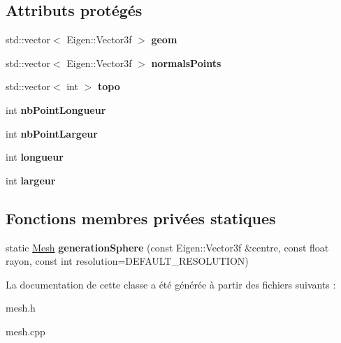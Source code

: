 \subsection*{Attributs protégés}
\begin{DoxyCompactItemize}
\item 
\hypertarget{class_mesh_a1560e73fd9881dc165885de0aadfcdc2}{}std\+::vector$<$ Eigen\+::\+Vector3f $>$ {\bfseries geom}\label{class_mesh_a1560e73fd9881dc165885de0aadfcdc2}

\item 
\hypertarget{class_mesh_ac979277bfe1f58be9e68cb288cd67ebe}{}std\+::vector$<$ Eigen\+::\+Vector3f $>$ {\bfseries normals\+Points}\label{class_mesh_ac979277bfe1f58be9e68cb288cd67ebe}

\item 
\hypertarget{class_mesh_a98e6ea69c9c4d5c60a5eced9dbac5147}{}std\+::vector$<$ int $>$ {\bfseries topo}\label{class_mesh_a98e6ea69c9c4d5c60a5eced9dbac5147}

\item 
\hypertarget{class_mesh_a2cd0699ab767418db3aea3027d6522a9}{}int {\bfseries nb\+Point\+Longueur}\label{class_mesh_a2cd0699ab767418db3aea3027d6522a9}

\item 
\hypertarget{class_mesh_a5323b83b4f9df2d911baffa57f0d93b8}{}int {\bfseries nb\+Point\+Largeur}\label{class_mesh_a5323b83b4f9df2d911baffa57f0d93b8}

\item 
\hypertarget{class_mesh_a6f6207f781ebba4a127022133935f6a1}{}int {\bfseries longueur}\label{class_mesh_a6f6207f781ebba4a127022133935f6a1}

\item 
\hypertarget{class_mesh_afd2da1422f179cd809ccc865389c69a3}{}int {\bfseries largeur}\label{class_mesh_afd2da1422f179cd809ccc865389c69a3}

\end{DoxyCompactItemize}
\subsection*{Fonctions membres privées statiques}
\begin{DoxyCompactItemize}
\item 
\hypertarget{class_mesh_a4ea59cab672813e564076bd296a5d8ea}{}static \hyperlink{class_mesh}{Mesh} {\bfseries generation\+Sphere} (const Eigen\+::\+Vector3f \&centre, const float rayon, const int resolution=D\+E\+F\+A\+U\+L\+T\+\_\+\+R\+E\+S\+O\+L\+U\+T\+I\+O\+N)\label{class_mesh_a4ea59cab672813e564076bd296a5d8ea}

\end{DoxyCompactItemize}


La documentation de cette classe a été générée à partir des fichiers suivants \+:\begin{DoxyCompactItemize}
\item 
mesh.\+h\item 
mesh.\+cpp\end{DoxyCompactItemize}
